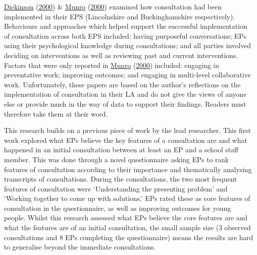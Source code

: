 \documentclass[
]{article}
\begin{document}
\protect\hyperlink{ref-dickinsonConsultationAssuringQuality2000a}{Dickinson}
(\protect\hyperlink{ref-dickinsonConsultationAssuringQuality2000a}{2000})
\& \protect\hyperlink{ref-munroAnglesDevelopingConsultation2000}{Munro}
(\protect\hyperlink{ref-munroAnglesDevelopingConsultation2000}{2000})
examined how consultation had been implemented in their EPS
(Lincolnshire and Buckinghamshire respectively). Behaviours and
approaches which helped support the successful implementation of
consultation across both EPS included: having purposeful conversations;
EPs using their psychological knowledge during consultations; and all
parties involved deciding on interventions as well as reviewing past and
current interventions. Factors that were only reported in
\protect\hyperlink{ref-munroAnglesDevelopingConsultation2000}{Munro}
(\protect\hyperlink{ref-munroAnglesDevelopingConsultation2000}{2000})
included: engaging in preventative work; improving outcomes; and
engaging in multi-level collaborative work. Unfortunately, these papers
are based on the author's reflections on the implementation of
consultation in their LA and do not give the views of anyone else or
provide much in the way of data to support their findings. Readers must
therefore take them at their word.

This research builds on a previous piece of work by the lead researcher.
This first work explored what EPs believe the key features of a
consultation are and what happened in an initial consultation between at
least an EP and a school staff member. This was done through a novel
questionnaire asking EPs to rank features of consultation according to
their importance and thematically analysing transcripts of
consultations. During the consultations, the two most frequent features
of consultation were `Understanding the presenting problem' and `Working
together to come up with solutions.' EPs rated these as core features of
consultation in the questionnaire, as well as improving outcomes for
young people. Whilst this research assessed what EPs believe the core
features are and what the features are of an initial consultation, the
small sample size (3 observed consultations and 8 EPs completing the
questionnaire) means the results are hard to generalise beyond the
immediate consultations.
\end{document}
